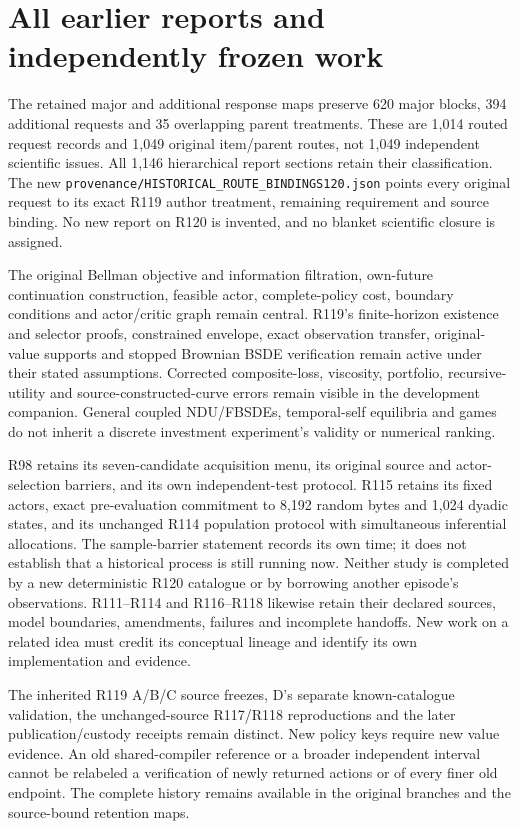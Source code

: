 \section{All earlier reports and independently frozen work}
The retained major and additional response maps preserve 620 major blocks,
394 additional requests and 35 overlapping parent treatments. These are
1,014 routed request records and 1,049 original item/parent routes, not
1,049 independent scientific issues. All 1,146 hierarchical report sections
retain their classification. The new
\nolinkurl{provenance/HISTORICAL_ROUTE_BINDINGS120.json}
points every original request to its exact R119 author treatment, remaining
requirement and source binding. No new report on R120 is invented, and no
blanket scientific closure is assigned.

The original Bellman objective and information filtration, own-future
continuation construction, feasible actor, complete-policy cost, boundary
conditions and actor/critic graph remain central. R119's finite-horizon
existence and selector proofs, constrained envelope, exact observation
transfer, original-value supports and stopped Brownian BSDE verification
remain active under their stated assumptions. Corrected composite-loss,
viscosity, portfolio, recursive-utility and source-constructed-curve errors
remain visible in the development companion. General coupled NDU/FBSDEs,
temporal-self equilibria and games do not inherit a discrete investment
experiment's validity or numerical ranking.

R98 retains its seven-candidate acquisition menu, its original source and
actor-selection barriers, and its own independent-test protocol. R115
retains its fixed actors, exact pre-evaluation commitment to 8,192 random
bytes and 1,024 dyadic states, and its unchanged R114 population protocol
with simultaneous inferential allocations. The sample-barrier statement
records its own time; it does not establish that a historical process is
still running now. Neither study is completed by a new deterministic R120
catalogue or by borrowing another episode's observations. R111--R114 and
R116--R118 likewise retain their declared sources, model boundaries,
amendments, failures and incomplete handoffs. New work on a related idea
must credit its conceptual lineage and identify its own implementation
and evidence.

The inherited R119 A/B/C source freezes, D's separate known-catalogue
validation, the unchanged-source R117/R118 reproductions and the later
publication/custody receipts remain distinct. New policy keys require new
value evidence. An old shared-compiler reference or a broader independent
interval cannot be relabeled a verification of newly returned actions or
of every finer old endpoint. The complete history remains available in
the original branches and the source-bound retention maps.


